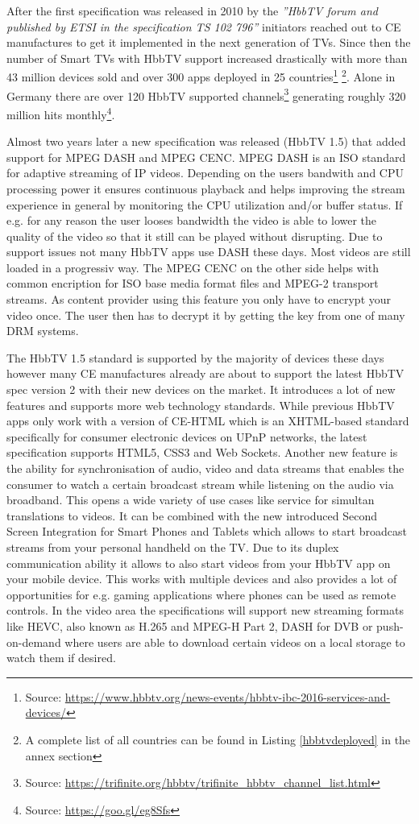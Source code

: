 After the first specification was released in 2010 by the \textit{''HbbTV forum and published by ETSI
in the specification TS 102 796''} \cite{evolution} initiators reached out to CE manufactures to get
it implemented in the next generation of TVs. Since then the number of Smart TVs with HbbTV support
increased drastically with more than 43 million devices sold and over 300 apps deployed in 25
countries\footnote{Source: \url{https://www.hbbtv.org/news-events/hbbtv-ibc-2016-services-and-devices/}}
\footnote{A complete list of all countries can be found in Listing \ref{hbbtvdeployed} in the annex section}.
Alone in Germany there are over 120 HbbTV supported channels\footnote{Source: \url{https://trifinite.org/hbbtv/trifinite_hbbtv_channel_list.html}}
generating roughly 320 million hits monthly\footnote{Source: \url{https://goo.gl/eg8Sfs}}.

Almost two years later a new specification was released (HbbTV 1.5) that added support for MPEG DASH
and MPEG CENC. MPEG DASH is an ISO standard for adaptive streaming of IP videos. Depending on the
users bandwith and CPU processing power it ensures continuous playback and helps improving the stream
experience in general by monitoring the CPU utilization and/or buffer status. If e.g. for any reason
the user looses bandwidth the video is able to lower the quality of the video so that it still can
be played without disrupting. Due to support issues not many HbbTV apps use DASH these days.
Most videos are still loaded in a progressiv way. The MPEG CENC on the other side helps with common
encription for ISO base media format files and MPEG-2 transport streams. As content provider using this
feature you only have to encrypt your video once. The user then has to decrypt it by getting the
key from one of many DRM systems.

The HbbTV 1.5 standard is supported by the majority of devices these days however many CE manufactures
already are about to support the latest HbbTV spec version 2 with their new devices on the market.
It introduces a lot of new features and supports more web technology standards. While previous HbbTV
apps only work with a version of CE-HTML which is an XHTML-based standard specifically for consumer
electronic devices on UPnP networks, the latest specification supports HTML5, CSS3 and Web Sockets.
Another new feature is the ability for synchronisation of audio, video and data streams that enables
the consumer to watch a certain broadcast stream while listening on the audio via broadband. This
opens a wide variety of use cases like service for simultan translations to videos. It can be
combined with the new introduced Second Screen Integration for Smart Phones and Tablets which
allows to start broadcast streams from your personal handheld on the TV. Due to its duplex
communication ability it allows to also start videos from your HbbTV app on your mobile device.
This works with multiple devices and also provides a lot of opportunities for e.g. gaming applications
where phones can be used as remote controls. In the video area the specifications will support
new streaming formats like HEVC, also known as H.265 and MPEG-H Part 2, DASH for DVB or
push-on-demand where users are able to download certain videos on a local storage to watch them
if desired.

